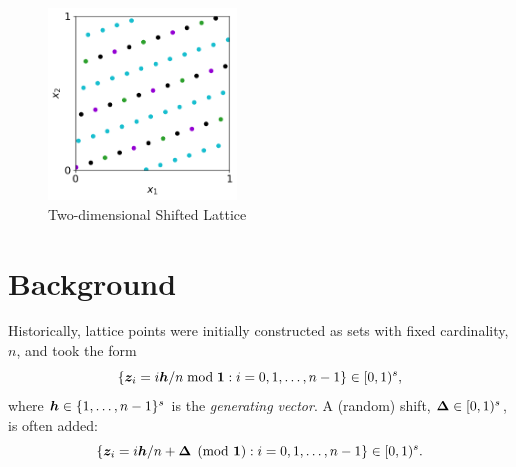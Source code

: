 \documentclass[authoryear]{elsarticle}
\begin{document}
\begin{figure}[h]
\centering
\includegraphics[width=5cm,clip]{lattice-plot.png}
\caption{Two-dimensional Shifted Lattice}
\label{fig:enter-label}
\end{figure}
\section{Background}

Historically, lattice points were initially constructed as sets with fixed cardinality, $n$, and took the form
\begin{equation} \label{eq:lat}
    \{\boldsymbol{z}_i = i \boldsymbol{h}/n \bmod{\boldsymbol{1}} : i=0,1, \ldots, n-1 \} \in [0,1)^s,
\end{equation}
where $\boldsymbol{h} \in \{1, \ldots, n-1\}^s$ is the \emph{generating vector}.  A (random) shift, $\boldsymbol{\Delta} \in [0,1)^s$, is often added:
\begin{equation} \label{eq:shlat}
    \{\boldsymbol{z}_i = i \boldsymbol{h}/n + \boldsymbol{\Delta} \pmod{\boldsymbol{1}} : i=0,1, \ldots, n-1 \} \in [0,1)^s.
\end{equation}




\end{document}
